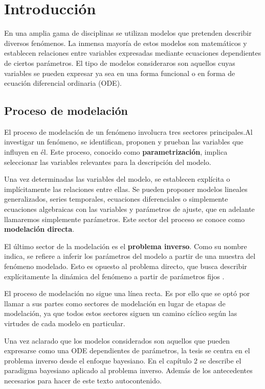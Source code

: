 \chapter{Introducción}

En una amplia gama de disciplinas se utilizan modelos que pretenden describir diversos fenómenos. La inmensa mayoría de estos modelos son matemáticos y establecen relaciones entre variables expresadas mediante ecuaciones dependientes de ciertos parámetros. El tipo de modelos consideraros son aquellos cuyas variables se pueden expresar ya sea en una forma funcional o en forma de ecuación diferencial ordinaria (ODE).

\section*{Proceso de modelación}

El proceso de modelación de un fenómeno involucra tres sectores principales.Al investigar un fenómeno, se identifican, proponen y prueban las variables que influyen en él. Este proceso, conocido como \textbf{parametrización}, implica seleccionar las variables relevantes para la descripción del modelo.

Una vez determinadas las variables del modelo, se establecen explícita o implícitamente las relaciones entre ellas. Se pueden proponer modelos lineales generalizados, series temporales, ecuaciones diferenciales o simplemente ecuaciones algebraicas con las variables y parámetros de ajuste, que en adelante llamaremos simplemente parámetros. Este sector del proceso se conoce como \textbf{modelación directa}.

El último sector de la modelación es el \textbf{problema inverso}. Como su nombre indica, se refiere a inferir los parámetros del modelo a partir de una muestra del fenómeno modelado. Esto es opuesto al problema directo, que busca describir explícitamente la dinámica del fenómeno a partir de parámetros fijos \cite{calvetti2018inverse}. 

El proceso de modelación no sigue una línea recta. Es por ello que se optó por llamar a sus partes como sectores de modelación en lugar de etapas de modelación, ya que todos estos sectores siguen un camino cíclico según las virtudes de cada modelo en particular. 

Una vez aclarado que los modelos considerados son aquellos que pueden expresarse como una ODE dependientes de parámetros, la tesis se centra en el problema inverso desde el enfoque bayesiano. En el capítulo 2 se describe el paradigma bayesiano aplicado al problema inverso. Además de los antecedentes necesarios para hacer de este texto autocontenido. 

